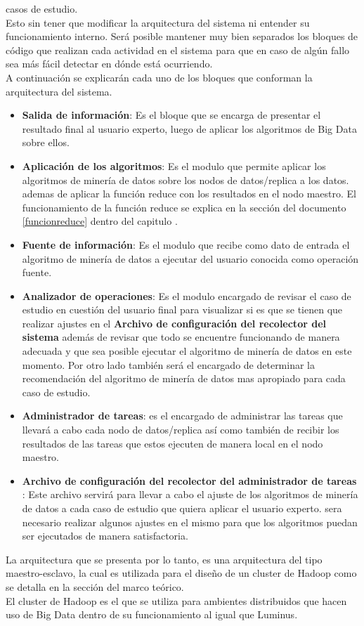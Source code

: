 casos de estudio. 
\\
Esto sin tener que modificar la arquitectura del sistema ni entender su funcionamiento interno. Será posible
mantener muy bien separados los bloques de código que realizan cada actividad en el sistema para que en caso de algún fallo sea
más fácil detectar en dónde está ocurriendo.
\\
A continuación se explicarán cada uno de los bloques que conforman la arquitectura del sistema.
\begin{itemize}
	\item \textbf{Salida de información}: Es el bloque que se encarga de presentar el resultado final al usuario experto, luego de aplicar los algoritmos de Big Data sobre ellos.
	\item \textbf{Aplicación de los algoritmos}: Es el modulo que permite aplicar los algoritmos de minería de datos sobre los nodos de datos/replica a los datos. ademas de aplicar la función reduce con los resultados en el nodo maestro.
	El funcionamiento de la función reduce se explica en la sección del documento \ref{funcionreduce} dentro del capitulo .
	\item \textbf{Fuente de información}: Es el modulo que recibe como dato de entrada el algoritmo de minería de datos a ejecutar del usuario conocida como operación fuente.
	\item \textbf{Analizador de operaciones}: Es el modulo encargado de revisar el caso de estudio en cuestión del usuario final para visualizar si es que se tienen que realizar ajustes en el \textbf{Archivo de configuración del recolector del sistema} además de revisar que todo se encuentre funcionando de manera adecuada y que sea posible ejecutar el algoritmo de minería de datos en este momento.
	Por otro lado también será el encargado de determinar la recomendación del algoritmo de minería de datos mas apropiado para cada caso de estudio.
	\item \textbf{Administrador de tareas}: es el encargado de administrar las tareas que llevará a cabo cada nodo de datos/replica así como también de recibir los resultados de las tareas que estos ejecuten de manera local en el nodo maestro.
	\item \textbf{Archivo de configuración del recolector del administrador de tareas }: Este archivo servirá para llevar a cabo el ajuste de los algoritmos de minería de datos a cada caso de estudio que quiera aplicar el usuario experto. sera necesario realizar algunos ajustes en el mismo para que los algoritmos puedan ser ejecutados de manera satisfactoria.
\end{itemize}
La arquitectura que se presenta por lo tanto, es una arquitectura del tipo maestro-esclavo, la cual es utilizada para el diseño de un cluster de Hadoop como se detalla en la sección  del marco teórico. 
\\
El cluster de Hadoop es el que se utiliza para ambientes distribuidos que hacen uso de Big Data dentro de su funcionamiento al igual que Luminus.  